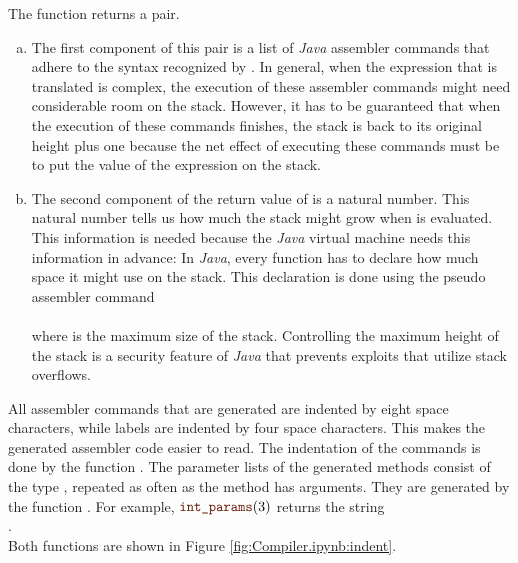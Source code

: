 The function  returns a pair.  
\begin{enumerate}[(a)]
\item The first component of this pair is a list of \textsl{Java} 
      assembler commands that adhere to the syntax recognized by .  In general, when the
      expression that is translated is complex, the execution of these assembler commands might need
      considerable room on the stack.  However, it has to be guaranteed that when the execution of these
      commands finishes, the stack is back to its original height plus one because the net 
      effect of executing these commands must be to put the value of the expression on the stack.
\item The second component of the return value of  is a natural number.
      This natural number tells us how much the stack might grow when  is evaluated.
      This information is needed because the \textsl{Java} virtual machine needs this information in advance:
      In \textsl{Java}, every function has to declare how much space it might use on the stack.
      This declaration is done using the pseudo assembler command
      \\[0.2cm]
      \hspace*{1.3cm}
       
      \\[0.2cm]
      where  is the maximum size of the stack.  Controlling the 
      maximum height of the stack is a security feature of \textsl{Java} that prevents exploits that
      utilize stack overflows.
\end{enumerate}
All assembler commands that are generated are indented by eight space characters, while labels are indented by
four space characters.  This makes the generated assembler code easier to read.  The indentation of the commands
is done by the function .  The parameter lists of the generated methods consist of the type
, repeated as often as the method has arguments.  They are generated by the function
.  For example, $\mytt{int\_params}(3)$ returns the string
\\[0.2cm]
\hspace*{1.3cm}
.
\\[0.2cm]
Both functions are shown in Figure \ref{fig:Compiler.ipynb:indent}.

